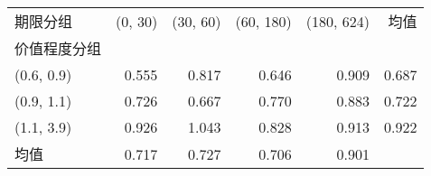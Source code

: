 \begin{tabular}{lrrrrr}
\toprule
期限分组 &  (0, 30) &  (30, 60) &  (60, 180) &  (180, 624) &  均值 \\
价值程度分组 &          &           &            &             &       \\
\midrule
(0.6, 0.9)    &    0.555 &     0.817 &      0.646 &       0.909 & 0.687 \\
(0.9, 1.1)    &    0.726 &     0.667 &      0.770 &       0.883 & 0.722 \\
(1.1, 3.9)    &    0.926 &     1.043 &      0.828 &       0.913 & 0.922 \\
均值          &    0.717 &     0.727 &      0.706 &       0.901 &       \\
\bottomrule
\end{tabular}
